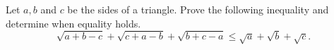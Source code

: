 Let $a,b$ and $c$ be the sides of a triangle.
Prove the following inequality and determine when equality holds. 
$$\sqrt{a+b-c} + \sqrt{c+a-b} + \sqrt{b+c-a} \leq \sqrt{a} + \sqrt{b} + \sqrt{c}.$$